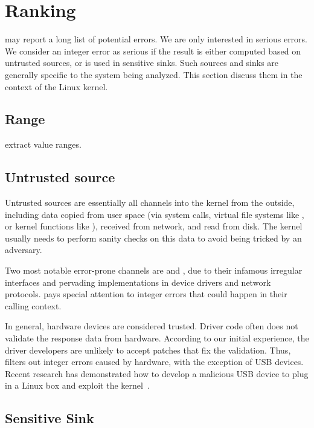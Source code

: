 \section{Ranking}
\label{s:rank}

\sys may report a long list of potential errors.  We are only interested
in serious errors.  We consider an integer error as serious if the
result is either computed based on untrusted sources, or is used in
sensitive sinks.  Such sources and sinks are generally specific to
the system being analyzed.  This section discuss them in the context
of the Linux kernel.

\subsection{Range}

extract value ranges.

\subsection{Untrusted source}

Untrusted sources are essentially all channels into the kernel from
the outside, including data copied from user space (via system
calls, virtual file systems like , or kernel functions
like ), received from network, and read from
disk.
The kernel usually needs to perform sanity checks on this data to
avoid being tricked by an adversary.

Two most notable error-prone channels are  and ,
due to their infamous irregular interfaces and pervading implementations
in device drivers and network protocols.  \sys pays special attention
to integer errors that could happen in their calling context.

In general, hardware devices are considered trusted.  Driver code
often does not validate the response data from hardware.  According
to our initial experience, the driver developers are unlikely to
accept patches that fix the validation.  Thus, \sys filters out
integer errors caused by hardware,
%
with the exception of USB devices.  Recent research has demonstrated
how to develop a malicious USB device to plug in a Linux box and
exploit the kernel~\cite{usb:buffer-overflow}.

\subsection{Sensitive Sink}

